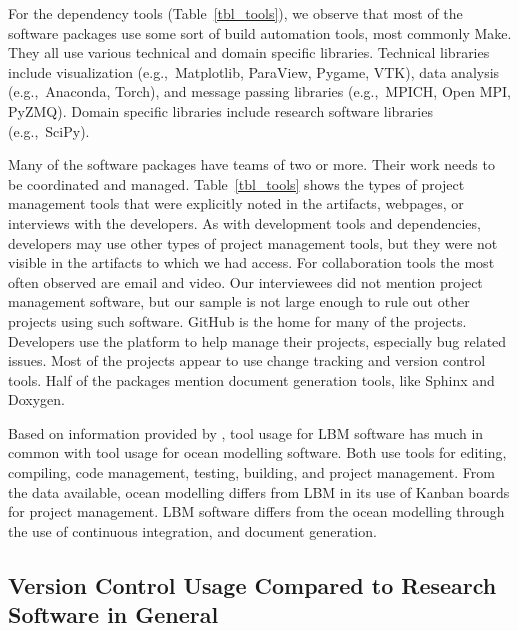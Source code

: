 \documentclass[final, 3p, times, authoryear]{elsarticle}
\begin{document}
For the dependency tools (Table~\ref{tbl_tools}), we observe that most of the
software packages use some sort of build automation tools, most commonly Make.
They all use various technical and domain specific libraries. Technical
libraries include visualization (e.g.,\ Matplotlib, ParaView, Pygame, VTK), data
analysis (e.g.,\ Anaconda, Torch), and message passing libraries (e.g.,\ MPICH,
Open MPI, PyZMQ). Domain specific libraries include research software libraries
(e.g.,\ SciPy).

Many of the software packages have teams of two or more. Their work needs to be
coordinated and managed. Table~\ref{tbl_tools} shows the types of project
management tools that were explicitly noted in the artifacts, webpages, or
interviews with the developers. As with development tools and dependencies,
developers may use other types of project management tools, but they were not
visible in the artifacts to which we had access.  For collaboration tools the
most often observed are email and video. Our interviewees did not mention
project management software, but our sample is not large enough to rule out
other projects using such software. GitHub is the home for many of the projects.
Developers use the platform to help manage their projects, especially bug
related issues. Most of the projects appear to use change tracking and version
control tools. Half of the packages mention document generation tools, like
Sphinx and Doxygen.

Based on information provided by \citet{JungEtAl2022}, tool usage for LBM
software has much in common with tool usage for ocean modelling software.  Both
use tools for editing, compiling, code management, testing, building, and
project management.  From the data available, ocean modelling differs from LBM
in its use of Kanban boards for project management. LBM software differs from
the ocean modelling through the use of continuous integration, and document
generation.

\subsection{Version Control Usage Compared to Research Software in General}
\end{document}

